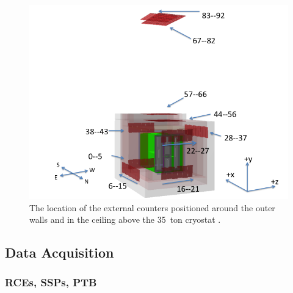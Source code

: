 \begin{figure}
  \centering
  \includegraphics[width=12cm]{35tonExternalCounters.png}
  \caption[The location of the external counters positioned around the outer walls and in the ceiling above the 35~ton cryostat.]{The location of the external counters positioned around the outer walls and in the ceiling above the 35~ton cryostat \cite{35tonExternalCounters}.}
  \label{fig:35tonExternalCounters}
\end{figure}

\subsection{Data Acquisition}\label{sec:35tonDataAcquisition}



\subsubsection{RCEs, SSPs, PTB}\label{sec:RCESSPPTB}

